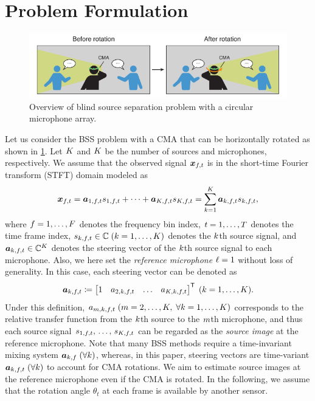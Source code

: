 \documentclass[sip,biber]{now-journal}
\begin{document}
\section{Problem Formulation}\label{sec:problem}
\begin{figure}[t]
  \centering
  \includegraphics{figures/diagrams/bss.pdf}%
  \caption{Overview of blind source separation problem with a circular microphone array.}%
  \label{fig:bss}
\end{figure}
Let us consider the BSS problem with a CMA that can be horizontally rotated as shown in \cref{fig:bss}.
Let $K$ and $K$ be the number of sources and microphones, respectively.
We assume that the observed signal $\Obs _{\ft}$ is in the short-time Fourier transform (STFT) domain modeled as
\begin{equation}
  \Obs _{\ft} = \steer _{1,\ft} \sig _{1,\ft} + \dots + \steer _{\Src,\ft} \sig _{\Src,\ft} = \sum _{\src=1} ^{\Src} \steer _{\src,\ft} \sig _{\src,\ft},\label{eq:mix}
\end{equation}
where $f = 1, \dots, F$ denotes the frequency bin index,
$t = 1, \dots, T$ denotes the time frame index,
$\sig _{\src,\ft} \in \C\; (\src = 1, \dots, \Src)$ denotes the $k$th source signal,
and $\steer _{\src,\ft} \in \C ^{\Mic}$ denotes the steering vector of the $k$th source signal to each microphone.
Also, we here set the \emph{reference microphone} $\ell = 1$ without loss of generality.
In this case, each steering vector can be denoted as
\begin{equation}
  \steer _{\src,\ft} \coloneqq \begin{bmatrix} 1 & \str _{2,\src,\ft} & \dots & \str _{\Mic,\src,\ft} \end{bmatrix} ^{\top}\; (\src = 1, \dots, \Src).
\end{equation}
Under this definition, $\str _{\mic,\src,\ft} \; (\mic = 2, \dots, \Mic,\; \forall \src = 1, \dots, \Src)$ corresponds to the relative transfer function from the $k$th source to the $m$th microphone, and thus each source signal $\sig _{1,\ft},\, \dots,\, \sig _{\Src,\ft}$ can be regarded as the \emph{source image} at the reference microphone.
Note that many BSS methods require a time-invariant mixing system $\bm{a} _{k,f}\; (\forall k)$,
whereas, in this paper, steering vectors are time-variant $\steer _{\src,\ft}\; (\forall \src)$ to account for CMA rotations.
We aim to estimate source images at the reference microphone even if the CMA is rotated.
In the following, we assume that the rotation angle $\theta_t$ at each frame is available by another sensor.
\end{document}
